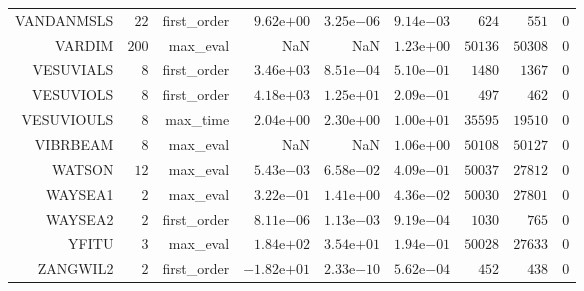 \begin{longtable}{rrrrrrrrr}
VANDANMSLS & \(    22\) & first\_order & \( 9.62\)e\(+00\) & \( 3.25\)e\(-06\) & \( 9.14\)e\(-03\) & \(   624\) & \(   551\) & \(     0\) \\
VARDIM & \(   200\) & max\_eval &       NaN &       NaN & \( 1.23\)e\(+00\) & \( 50136\) & \( 50308\) & \(     0\) \\
VESUVIALS & \(     8\) & first\_order & \( 3.46\)e\(+03\) & \( 8.51\)e\(-04\) & \( 5.10\)e\(-01\) & \(  1480\) & \(  1367\) & \(     0\) \\
VESUVIOLS & \(     8\) & first\_order & \( 4.18\)e\(+03\) & \( 1.25\)e\(+01\) & \( 2.09\)e\(-01\) & \(   497\) & \(   462\) & \(     0\) \\
VESUVIOULS & \(     8\) & max\_time & \( 2.04\)e\(+00\) & \( 2.30\)e\(+00\) & \( 1.00\)e\(+01\) & \( 35595\) & \( 19510\) & \(     0\) \\
VIBRBEAM & \(     8\) & max\_eval &       NaN &       NaN & \( 1.06\)e\(+00\) & \( 50108\) & \( 50127\) & \(     0\) \\
WATSON & \(    12\) & max\_eval & \( 5.43\)e\(-03\) & \( 6.58\)e\(-02\) & \( 4.09\)e\(-01\) & \( 50037\) & \( 27812\) & \(     0\) \\
WAYSEA1 & \(     2\) & max\_eval & \( 3.22\)e\(-01\) & \( 1.41\)e\(+00\) & \( 4.36\)e\(-02\) & \( 50030\) & \( 27801\) & \(     0\) \\
WAYSEA2 & \(     2\) & first\_order & \( 8.11\)e\(-06\) & \( 1.13\)e\(-03\) & \( 9.19\)e\(-04\) & \(  1030\) & \(   765\) & \(     0\) \\
YFITU & \(     3\) & max\_eval & \( 1.84\)e\(+02\) & \( 3.54\)e\(+01\) & \( 1.94\)e\(-01\) & \( 50028\) & \( 27633\) & \(     0\) \\
ZANGWIL2 & \(     2\) & first\_order & \(-1.82\)e\(+01\) & \( 2.33\)e\(-10\) & \( 5.62\)e\(-04\) & \(   452\) & \(   438\) & \(     0\) \\\hline
\end{longtable}
